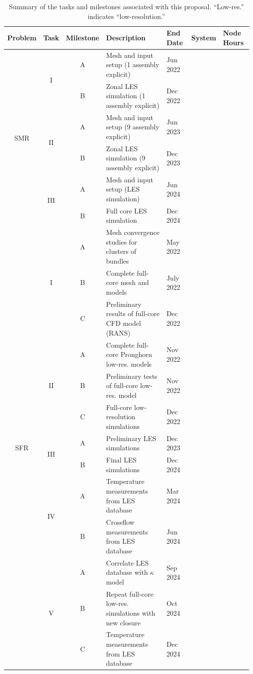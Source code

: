\begin{table}[h!]
\footnotesize
\centering
\caption{Summary of the tasks and milestones associated with this proposal. ``Low-res.'' indicates ``low-resolution.''}
\begin{tabular}{c c c l l l l}
\toprule
Problem & Task & Milestone & Description & End Date & System & Node Hours\\
\midrule
\multirow{6}{*}{SMR} & \multirow{2}{*}{I} & A & Mesh and input setup (1 assembly explicit) & Jun 2022 \\
&  & B & Zonal LES simulation (1 assembly explicit)  & Dec 2022 \\\cmidrule{2-5}
& \multirow{2}{*}{II} & A & Mesh and input setup (9 assembly explicit)  & Jun 2023 \\
&  & B & Zonal LES simulation (9 assembly explicit)  & Dec 2023 \\\cmidrule{2-5}
& \multirow{2}{*}{III} & A & Mesh and input setup (LES simulation) & Jun 2024 \\
&  & B & Full core LES simulation  & Dec 2024 \\
\midrule
\multirow{14}{*}{SFR} & \multirow{3}{*}{I} & A & Mesh convergence studies for clusters of bundles & May 2022 \\
& & B & Complete full-core mesh and models & July 2022\\
& & C & Preliminary results of full-core CFD model (RANS) & Dec 2022\\\cmidrule{2-5}
& \multirow{3}{*}{II} & A & Complete full-core Pronghorn low-res. models & Nov 2022 \\
& & B & Preliminary tests of full-core low-res. model & Nov 2022\\
& & C & Full-core low-resolution simulations & Dec 2022\\\cmidrule{2-5}
& \multirow{2}{*}{III} & A & Preliminary LES simulations  & Dec 2023\\
& & B & Final LES simulations  & Dec 2024\\\cmidrule{2-5}
& \multirow{2}{*}{IV} & A & Temperature measurements from LES database & Mar 2024\\
& & B & Crossflow measurements from LES database & Jun 2024\\\cmidrule{2-5}
& \multirow{3}{*}{V} & A & Correlate LES database with \(\kappa\) model & Sep 2024\\
& & B & Repeat full-core low-res. simulations with new closure & Oct 2024\\
& & C & Temperature measurements from LES database & Dec 2024\\
\bottomrule
\end{tabular}
\label{tab:milestones}
\end{table}


